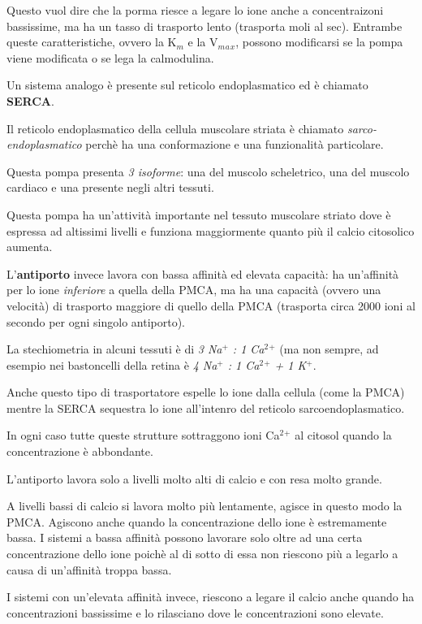 \documentclass[]{article}
\begin{document}
Questo vuol dire che la porma riesce a legare lo ione anche a
concentraizoni bassissime, ma ha un tasso di trasporto lento (trasporta
moli al sec). Entrambe queste caratteristiche, ovvero la K\(_m\) e la
V\(_m\)\(_a\)\(_x\), possono modificarsi se la pompa viene modificata o
se lega la calmodulina.

Un sistema analogo è presente sul reticolo endoplasmatico ed è chiamato
\textbf{SERCA}.

Il reticolo endoplasmatico della cellula muscolare striata è chiamato
\emph{sarco-endoplasmatico} perchè ha una conformazione e una
funzionalità particolare.

Questa pompa presenta \emph{3 isoforme}: una del muscolo scheletrico,
una del muscolo cardiaco e una presente negli altri tessuti.

Questa pompa ha un'attività importante nel tessuto muscolare striato
dove è espressa ad altissimi livelli e funziona maggiormente quanto più
il calcio citosolico aumenta.

L'\textbf{antiporto} invece lavora con bassa affinità ed elevata
capacità: ha un'affinità per lo ione \emph{inferiore} a quella della
PMCA, ma ha una capacità (ovvero una velocità) di trasporto maggiore di
quello della PMCA (trasporta circa 2000 ioni al secondo per ogni singolo
antiporto).

La stechiometria in alcuni tessuti è di \emph{3 Na\(^+\) : 1
Ca\(^2\)\(^+\)} (ma non sempre, ad esempio nei bastoncelli della retina
è \emph{4 Na\(^+\) : 1 Ca\(^2\)\(^+\) + 1 K\(^+\)}.

Anche questo tipo di trasportatore espelle lo ione dalla cellula (come
la PMCA) mentre la SERCA sequestra lo ione all'intenro del reticolo
sarcoendoplasmatico.

In ogni caso tutte queste strutture sottraggono ioni Ca\(^2\)\(^+\) al
citosol quando la concentrazione è abbondante.

L'antiporto lavora solo a livelli molto alti di calcio e con resa molto
grande.

A livelli bassi di calcio si lavora molto più lentamente, agisce in
questo modo la PMCA. Agiscono anche quando la concentrazione dello ione
è estremamente bassa. I sistemi a bassa affinità possono lavorare solo
oltre ad una certa concentrazione dello ione poichè al di sotto di essa
non riescono più a legarlo a causa di un'affinità troppa bassa.

I sistemi con un'elevata affinità invece, riescono a legare il calcio
anche quando ha concentrazioni bassissime e lo rilasciano dove le
concentrazioni sono elevate.
\end{document}
